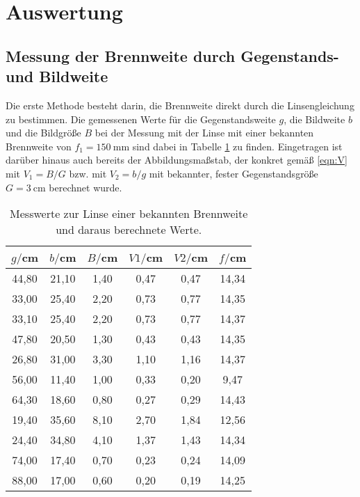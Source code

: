 \section{Auswertung}
\label{sec:Auswertung}

\subsection{Messung der Brennweite durch Gegenstands- und Bildweite}
Die erste Methode besteht darin, die Brennweite direkt durch die Linsengleichung
zu bestimmen. Die gemessenen Werte für die Gegenstandsweite $g$, die Bildweite
$b$ und die Bildgröße $B$  bei der Messung mit der Linse mit einer bekannten
Brennweite von $f_1 = \SI{150}{\milli\meter}$ sind dabei in Tabelle
\ref{tab:bekannt} zu finden. Eingetragen ist darüber hinaus auch bereits der
Abbildungsmaßstab, der konkret gemäß \eqref{eqn:V} mit $V_1=B/G$ bzw. mit $V_2=b/g$
mit bekannter, fester Gegenstandsgröße $G = \SI{3}{\centi\meter}$ berechnet wurde.


\begin{table}[htp]
	\begin{center}
    \caption{Messwerte zur Linse einer bekannten Brennweite und daraus berechnete Werte.}
    \label{tab:bekannt}
		\begin{tabular}{cccccc}
		\toprule
			{$g/$cm} & {$b/$cm} & {$B/$cm} & {$V1/$cm} & {$V2/$cm} & {$f/$cm}\\
			\midrule
			44,80 & 21,10 & 1,40 & 0,47 & 0,47 & 14,34\\
			33,00 & 25,40 & 2,20 & 0,73 & 0,77 & 14,35\\
			33,10 & 25,40 & 2,20 & 0,73 & 0,77 & 14,37\\
			47,80 & 20,50 & 1,30 & 0,43 & 0,43 & 14,35\\
			26,80 & 31,00 & 3,30 & 1,10 & 1,16 & 14,37\\
			56,00 & 11,40 & 1,00 & 0,33 & 0,20 & 9,47\\
			64,30 & 18,60 & 0,80 & 0,27 & 0,29 & 14,43\\
			19,40 & 35,60 & 8,10 & 2,70 & 1,84 & 12,56\\
			24,40 & 34,80 & 4,10 & 1,37 & 1,43 & 14,34\\
			74,00 & 17,40 & 0,70 & 0,23 & 0,24 & 14,09\\
			88,00 & 17,00 & 0,60 & 0,20 & 0,19 & 14,25\\
		\bottomrule
		\end{tabular}
	\end{center}
\end{table}


